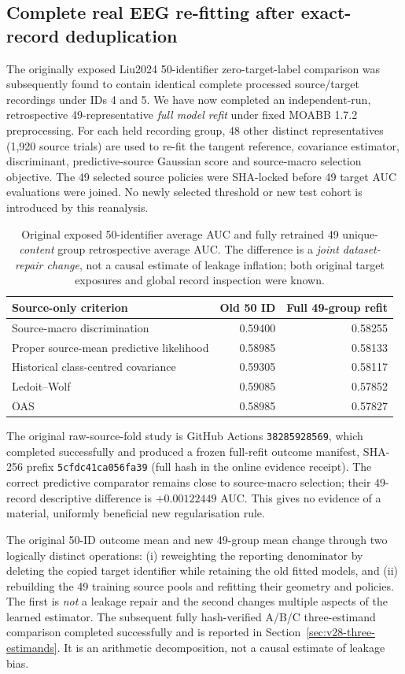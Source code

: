 \subsection{Complete real EEG re-fitting after exact-record deduplication}
\label{sec:v28-purged-actual}
The originally exposed Liu2024 50-identifier zero-target-label
comparison was subsequently found to contain identical complete
processed source/target recordings under IDs 4 and 5.
We have now completed an independent-run, retrospective
49-representative \emph{full model refit} under fixed
MOABB 1.7.2 preprocessing. For each held recording group,
48 other distinct representatives (1,920 source trials)
are used to re-fit the tangent reference, covariance
estimator, discriminant, predictive-source Gaussian score
and source-macro selection objective. The 49 selected source
policies were SHA-locked before 49 target AUC evaluations
were joined. No newly selected threshold or new test
cohort is introduced by this reanalysis.

\begin{table}[tb]
\centering\small
\caption{Original exposed 50-identifier average AUC and fully
retrained 49 unique-\emph{content} group retrospective average
AUC. The difference is a \emph{joint dataset-repair change},
not a causal estimate of leakage inflation; both original
target exposures and global record inspection were known.}
\label{tab:v28-fullrefit}
\begin{tabular}{lrr}
\toprule
Source-only criterion & Old 50 ID & Full 49-group refit\\
\midrule
Source-macro discrimination & 0.59400 & 0.58255\\
Proper source-mean predictive likelihood & 0.58985 & 0.58133\\
Historical class-centred covariance & 0.59305 & 0.58117\\
Ledoit--Wolf & 0.59085 & 0.57852\\
OAS & 0.58985 & 0.57827\\
\bottomrule
\end{tabular}
\end{table}

The original raw-source-fold study is GitHub Actions
\texttt{38285928569}, which completed successfully
and produced a frozen full-refit outcome manifest,
SHA-256 prefix \texttt{5cfdc41ca056fa39}
(full hash in the online evidence receipt).
The correct predictive comparator remains close to
source-macro selection; their 49-record descriptive
difference is $+0.00122449$ AUC.
This gives no evidence of a material, uniformly
beneficial new regularisation rule.

The original 50-ID outcome mean and new 49-group
mean change through two logically distinct operations:
(i) reweighting the reporting denominator by deleting
the copied target identifier while retaining the old
fitted models, and (ii) rebuilding the 49 training
source pools and refitting their geometry and policies.
The first is \emph{not} a leakage repair and the
second changes multiple aspects of the learned estimator.
The subsequent fully hash-verified A/B/C
three-estimand comparison completed successfully
and is reported in
Section~\ref{sec:v28-three-estimands}.
It is an arithmetic decomposition, not a causal
estimate of leakage bias.
